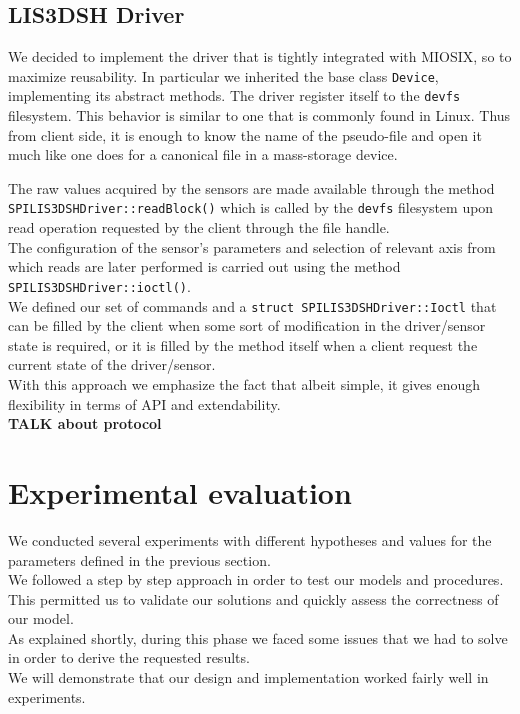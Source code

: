 \subsection{LIS3DSH Driver}
We decided to implement the driver that is tightly integrated with MIOSIX, so to maximize reusability. In particular we inherited the base class \texttt{Device}, implementing its abstract methods. The driver register itself to the \texttt{devfs} filesystem. This behavior is similar to one that is commonly found in Linux. Thus from client side, it is enough to know the name of the pseudo-file and open it much like one does for a canonical file in a mass-storage device.  \par The raw values acquired by the sensors are made available through the method \\ \texttt{SPILIS3DSHDriver::readBlock()} which is called by the \texttt{devfs} filesystem upon read operation requested by the client through the file handle. \\
The configuration of the sensor's parameters and selection of relevant axis from which reads are later performed is carried out using the method \texttt{SPILIS3DSHDriver::ioctl()}. \\ We defined our set of commands and a \texttt{struct SPILIS3DSHDriver::Ioctl} that can be filled by the client when some sort of modification in the driver/sensor state is required, or it is filled by the method itself when a client request the current state of the driver/sensor. \\ With this approach we emphasize the fact that albeit simple, it gives enough flexibility in terms of API and extendability.\\
\textbf{TALK about protocol}

\section{Experimental evaluation}
We conducted several experiments with different hypotheses and values for the parameters defined in the previous section. \\
We followed a step by step approach in order to test our models and procedures. This permitted us to validate our solutions and quickly assess the correctness of our model. \\
As explained shortly, during this phase we faced some issues that we had to solve in order to derive the requested results. \\
We will demonstrate that our design and implementation worked fairly well in experiments.
